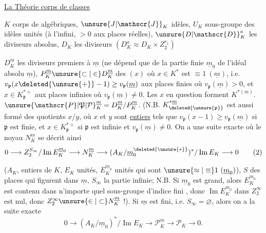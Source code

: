 \uline{La Théorie  corps de classes}

$K$ corps de  algébriques, ${\unsure{J|\mathscr{J}}}_K$  idèles, $U_K$  sous-groupe des idèles unités (à l'infini,  $>0$ aux places réelles), ${\unsure{D|\mathscr{D}}}^a_K$ les diviseurs absolus, $D_K$ les diviseurs $(D^a_K\approx D_K\times Z_2^{r_1})$


$D^{\underline m}_K$ les diviseurs premiers à $\underline m$ (ne dépend que de la partie finie $\underline m_0$ de l'idéal absolu $\underline m$), $P^{\underline m}_K\unsure{\subset|\in}D^{\underline m}_K$  des $(x)$ où $x\in K^*$ est $\equiv1\ (\underline m)$, i.e. $v_{\mathfrak p}(x\deleted{\unsure{+}}-1)\geq v_{\mathfrak p}(\underline m)$ aux places finies où $v_{\mathfrak p}(\underline m)>0$, et  $x\in K_{\mathfrak p}^{*+}$ aux places infinies où $v_{\mathfrak p}(\underline m)\neq0$. Les $x$ en question forment $K^{*(\underline m)}$. ${\unsure{\mathscr{P}|\mathfrak{P}|\mathcal{P}}}^{\underline m}_K=D^{\underline m}_K/P^{\underline m}_K$. (N.B. $K_{\deleted{\unsure{\mathfrak p}}}^{*\underline m}$ est aussi formé des quotients $x/y$, où $x$ et $y$ sont \uline{entiers} tels que $v_{\mathfrak p}(x-1)\geq v_{\mathfrak p}(\underline m)$ si $\mathfrak p$ est finie, et $x\in K_{\mathfrak p}^{*+}$ si $\mathfrak p$ est infinie et $v_{\mathfrak p}(\underline m)\neq0$. On a une suite exacte
où le noyau $N_K^{\underline m}$ se décrit ainsi
\[
0\longrightarrow Z_2^{S_\infty}/\operatorname{Im}E_K^{\underline m_0}\longrightarrow N_K^{\underline m}\longrightarrow(A_K/\underline m_0^{\deleted{\unsure{*}}})^*/\operatorname{Im}E_K\longrightarrow0
\tag*{(2)}
\]

($A_K$, entiers de $K$, $E_K$ unités, $E_K^{\underline m_0}$ unités qui sont $\unsure{\approx|\equiv}1\ (\underline m_0)$), $S$  des places qui figurent dans $\underline m$, $S_\infty$ la partie infinie; N.B. Si $\underline m_0$ est grand, alors $E_K^{\underline m_0}$ est contenu dans n'importe quel sous-groupe d'indice fini , donc $\operatorname{Im}E_K^{\underline m_0}$ dans $Z_2^\infty$ est nul, donc $Z_2^\infty\unsure{\in|\subset}N_K^{\underline m}$ !). Si $\underline m$ est fini, i.e. $S_\infty=\varnothing$, alors on a la suite exacte
\[
0\longrightarrow(A_K/\underline m_0)^*/\operatorname{Im}E_K\longrightarrow\mathscr{P}_K^{\underline m}\longrightarrow\mathscr{P}_K\longrightarrow0.
\]

